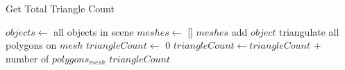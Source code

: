 ﻿\documentclass[a4paper]{article}
\begin{document}
    \begin{algorithm}
        \caption{Get Total Triangle Count}\label{alg:cap}
        \begin{algorithmic}[1]
            \State $objects \gets$ all objects in scene
            \State $meshes \gets$ []
                    \State $meshes$ add $object$
                \EndIf
            \EndFor
                \State triangulate all polygons on $mesh$
            \EndFor
            \State $triangleCount \gets$ 0
                \State $triangleCount \gets triangleCount$ + number of $polygons_{mesh}$
            \EndFor
            \State \Return $triangleCount$
        \end{algorithmic}
    \end{algorithm}
\end{document}
